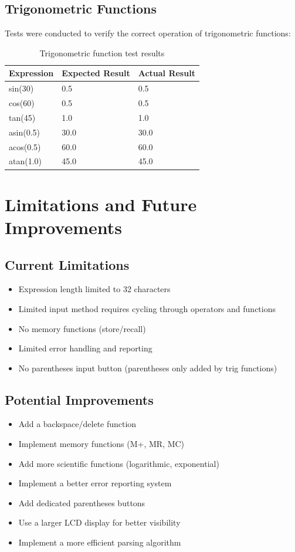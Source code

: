 \documentclass[12pt,a4paper]{article}
\begin{document}
\subsection{Trigonometric Functions}
Tests were conducted to verify the correct operation of trigonometric functions:
\begin{table}[h]
\centering
\begin{tabular}{|l|l|l|}
\hline
\textbf{Expression} & \textbf{Expected Result} & \textbf{Actual Result} \\
\hline
sin(30) & 0.5 & 0.5 \\
\hline
cos(60) & 0.5 & 0.5 \\
\hline
tan(45) & 1.0 & 1.0 \\
\hline
asin(0.5) & 30.0 & 30.0 \\
\hline
acos(0.5) & 60.0 & 60.0 \\
\hline
atan(1.0) & 45.0 & 45.0 \\
\hline
\end{tabular}
\caption{Trigonometric function test results}
\end{table}

\section{Limitations and Future Improvements}
\subsection{Current Limitations}
\begin{itemize}
    \item Expression length limited to 32 characters
    \item Limited input method requires cycling through operators and functions
    \item No memory functions (store/recall)
    \item Limited error handling and reporting
    \item No parentheses input button (parentheses only added by trig functions)
\end{itemize}

\subsection{Potential Improvements}
\begin{itemize}
    \item Add a backspace/delete function
    \item Implement memory functions (M+, MR, MC)
    \item Add more scientific functions (logarithmic, exponential)
    \item Implement a better error reporting system
    \item Add dedicated parentheses buttons
    \item Use a larger LCD display for better visibility
    \item Implement a more efficient parsing algorithm
\end{itemize}
\end{document}
